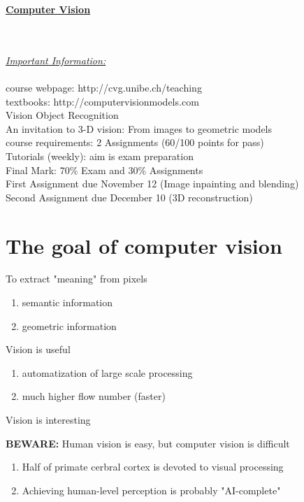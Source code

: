\documentclass{report}
\begin{document}
 \begin{center}
 \huge{\textbf{\underline{Computer Vision}}}
 \end{center}
 \hfill \\ \\
 
 \underline{\textit{Important Information:}} \\ \\
 	course webpage: http://cvg.unibe.ch/teaching \\
 	textbooks: http://computervisionmodels.com \\
 				Vision Object Recognition \\
 				An invitation to 3-D vision: From images to geometric models \\
 	course requirements: 2 Assignments (60/100 points for pass) \\
 	Tutorials (weekly): aim is exam preparation \\
 	Final Mark: 70\% Exam and 30\% Assignments \\
 	First Assignment due November 12 (Image inpainting and blending) \\
 	Second Assignment due December 10 (3D reconstruction) \\
 	
 \chapter{The goal of computer vision}
 \begin{compactenum}[$\bullet$]
 	\item To extract "meaning" from pixels
 		\begin{enumerate}
 			\item semantic information
 			\item geometric information
 		\end{enumerate}
 	\item Vision is useful
 		\begin{enumerate}
 			\item automatization of large scale processing
 			\item much higher flow number (faster)
 		\end{enumerate}
 	\item Vision is interesting
 	\item \textbf{BEWARE:} Human vision is easy, but computer vision is difficult
 		\begin{enumerate}
 			\item Half of primate cerbral cortex is devoted to visual processing
 			\item Achieving human-level perception is probably "AI-complete"
 		\end{enumerate}
 \end{compactenum}
 
 
\end{document}
